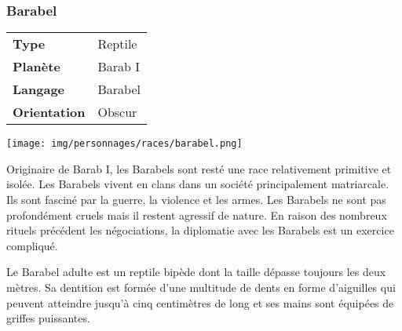 \subsubsection{Barabel}
\begin{samepage}
	\begin{flushright}
		\begin{tabular}{ l l }
			\textbf{Type} 			& Reptile \\
		   	\textbf{Planète} 		& Barab I \\
		   	\textbf{Langage} 		& Barabel \\
		   	\textbf{Orientation} 	& Obscur \\
		\end{tabular}
	\end{flushright}

	\vspace{-5\baselineskip}
	\texttt{[image: img/personnages/races/barabel.png]}
\end{samepage}

Originaire de Barab I, les Barabels sont resté une race relativement primitive et isolée. Les Barabels vivent en clans dans un société principalement matriarcale. Ils sont fasciné par la guerre, la violence et les armes. Les Barabels ne sont pas profondément cruels mais il restent agressif de nature. En raison des nombreux rituels précédent les négociations, la diplomatie avec les Barabels est un exercice compliqué.

Le Barabel adulte est un reptile bipède dont la taille dépasse toujours les deux mètres. Sa dentition est formée d’une multitude de dents en forme d’aiguilles qui peuvent atteindre jusqu’à cinq centimètres de long et ses mains sont équipées de griffes puissantes.

